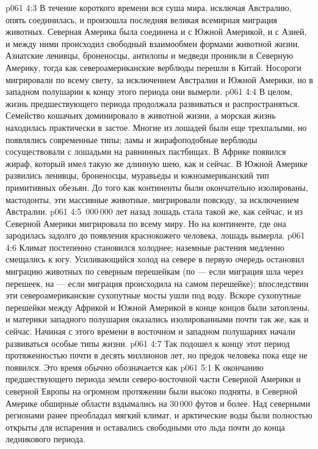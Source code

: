 \vs p061 4:3 В течение короткого времени вся суша мира, исключая Австралию, опять соединилась, и произошла последняя великая всемирная миграция животных. Северная Америка была соединена и с Южной Америкой, и с Азией, и между ними происходил свободный взаимообмен формами животной жизни. Азиатские ленивцы, броненосцы, антилопы и медведи проникли в Северную Америку, тогда как североамериканские верблюды перешли в Китай. Носороги мигрировали по всему свету, за исключением Австралии и Южной Америки, но в западном полушарии к концу этого периода они вымерли.
\vs p061 4:4 В целом, жизнь предшествующего периода продолжала развиваться и распространяться. Семейство кошачьих доминировало в животной жизни, а морская жизнь находилась практически в застое. Многие из лошадей были еще трехпалыми, но появлялись современные типы; ламы и жирафоподобные верблюды сосуществовали с лошадьми на равнинных пастбищах. В Африке появился жираф, который имел такую же длинную шею, как и сейчас. В Южной Америке развились ленивцы, броненосцы, муравьеды и южноамериканский тип примитивных обезьян. До того как континенты были окончательно изолированы, мастодонты, эти массивные животные, мигрировали повсюду, за исключением Австралии.
\vs p061 4:5 \,000\,000 лет назад лошадь стала такой же, как сейчас, и из Северной Америки мигрировала по всему миру. Но на континенте, где она зародилась задолго до появления краснокожего человека, лошадь вымерла.
\vs p061 4:6 Климат постепенно становился холоднее; наземные растения медленно смещались к югу. Усиливающийся холод на севере в первую очередь остановил миграцию животных по северным перешейкам (по --- если миграция шла через перешеек, на --- если миграция происходила на самом перешейке); впоследствии эти североамериканские сухопутные мосты ушли под воду. Вскоре сухопутные перешейки между Африкой и Южной Америкой в конце концов были затоплены, и материки западного полушария оказались изолированными почти так же, как и сейчас. Начиная с этого времени в восточном и западном полушариях начали развиваться особые типы жизни.
\vs p061 4:7 \pc Так подошел к концу этот период протяженностью почти в десять миллионов лет, но предок человека пока еще не появился. Это время обычно обозначается как 
\vs p061 5:1 К окончанию предшествующего периода земли северо\hyp{}восточной части Северной Америки и северной Европы на огромном протяжении были высоко подняты, в Северной Америке обширные области вздымались на 30\,000 футов и более. Над северными регионами ранее преобладал мягкий климат, и арктические воды были полностью открыты для испарения и оставались свободными ото льда почти до конца ледникового периода.
